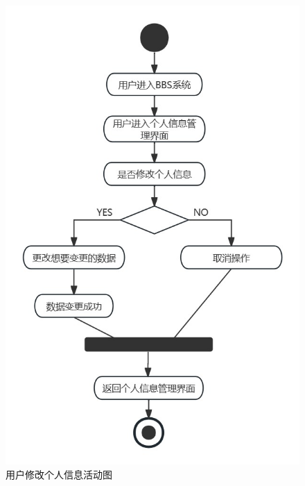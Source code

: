 \documentclass[UTF8]{ctexart}
\begin{document}
\begin{figure}[H]
  \centering
  \includegraphics[scale=0.25]{活动图/用户修改个人信息活动图.jpg}
  \caption{用户修改个人信息活动图}
\end{figure}
\end{document}
